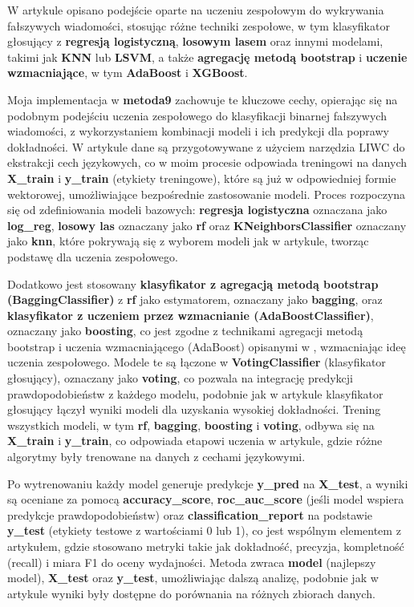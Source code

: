 W artykule \cite{metoda9} opisano podejście oparte na uczeniu zespołowym do wykrywania fałszywych wiadomości, stosując różne techniki zespołowe, w tym klasyfikator głosujący z \textbf{regresją logistyczną}, \textbf{losowym lasem} oraz innymi modelami, takimi jak \textbf{KNN} lub \textbf{LSVM}, a także \textbf{agregację metodą bootstrap} i \textbf{uczenie wzmacniające}, w tym \textbf{AdaBoost} i \textbf{XGBoost}.

Moja implementacja w \textbf{metoda9} zachowuje te kluczowe cechy, opierając się na podobnym podejściu uczenia zespołowego do klasyfikacji binarnej fałszywych wiadomości, z wykorzystaniem kombinacji modeli i ich predykcji dla poprawy dokładności. W artykule dane są przygotowywane z użyciem narzędzia LIWC do ekstrakcji cech językowych, co w moim procesie odpowiada treningowi na danych \textbf{X\_train} i \textbf{y\_train} (etykiety treningowe), które są już w odpowiedniej formie wektorowej, umożliwiające bezpośrednie zastosowanie modeli. Proces rozpoczyna się od zdefiniowania modeli bazowych: \textbf{regresja logistyczna} oznaczana jako \textbf{log\_reg}, \textbf{losowy las} oznaczany jako \textbf{rf} oraz \textbf{KNeighborsClassifier} oznaczany jako \textbf{knn}, które pokrywają się z wyborem modeli jak w artykule, tworząc podstawę dla uczenia zespołowego.

Dodatkowo jest stosowany \textbf{klasyfikator z agregacją metodą bootstrap (BaggingClassifier)} z \textbf{rf} jako estymatorem, oznaczany jako \textbf{bagging}, oraz \textbf{klasyfikator z uczeniem przez wzmacnianie (AdaBoostClassifier)}, oznaczany jako \textbf{boosting}, co jest zgodne z technikami agregacji metodą bootstrap i uczenia wzmacniającego (AdaBoost) opisanymi w \cite{metoda9}, wzmacniając ideę uczenia zespołowego. Modele te są łączone w \textbf{VotingClassifier} (klasyfikator głosujący), oznaczany jako \textbf{voting}, co pozwala na integrację predykcji prawdopodobieństw z każdego modelu, podobnie jak w artykule klasyfikator głosujący łączył wyniki modeli dla uzyskania wysokiej dokładności. Trening wszystkich modeli, w tym \textbf{rf}, \textbf{bagging}, \textbf{boosting} i \textbf{voting}, odbywa się na \textbf{X\_train} i \textbf{y\_train}, co odpowiada etapowi uczenia w artykule, gdzie różne algorytmy były trenowane na danych z cechami językowymi.

Po wytrenowaniu każdy model generuje predykcje \textbf{y\_pred} na \textbf{X\_test}, a wyniki są oceniane za pomocą \textbf{accuracy\_score}, \textbf{roc\_auc\_score} (jeśli model wspiera predykcje prawdopodobieństw) oraz \textbf{classification\_report} na podstawie \textbf{y\_test} (etykiety testowe z wartościami 0 lub 1), co jest wspólnym elementem z artykułem, gdzie stosowano metryki takie jak dokładność, precyzja, kompletność (recall) i miara F1 do oceny wydajności. Metoda zwraca \textbf{model} (najlepszy model), \textbf{X\_test} oraz \textbf{y\_test}, umożliwiając dalszą analizę, podobnie jak w artykule wyniki były dostępne do porównania na różnych zbiorach danych.

